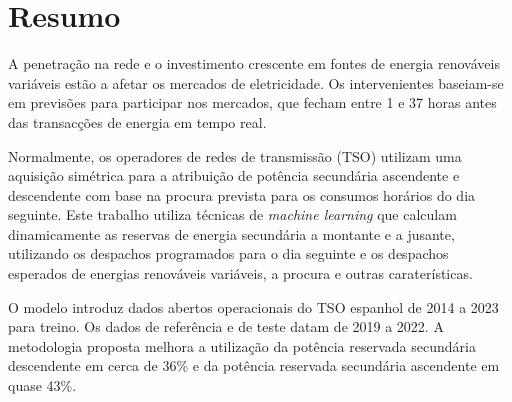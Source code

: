 \chapter{Resumo}
\justifying
A penetração na rede e o investimento crescente em fontes de energia renováveis variáveis estão a afetar os mercados de eletricidade. Os intervenientes baseiam-se em previsões para participar nos mercados, que fecham entre 1 e 37 horas antes das transacções de energia em tempo real.\par
Normalmente, os operadores de redes de transmissão (TSO) utilizam uma aquisição simétrica para a atribuição de potência secundária ascendente e descendente com base na procura prevista para os consumos horários do dia seguinte. Este trabalho utiliza técnicas de \emph{machine learning} que calculam dinamicamente as reservas de energia secundária a montante e a jusante, utilizando os despachos programados para o dia seguinte e os despachos esperados de energias renováveis variáveis, a procura e outras caraterísticas.\par
O modelo introduz dados abertos operacionais do TSO espanhol de 2014 a 2023 para treino. Os dados de referência e de teste datam de 2019 a 2022. A metodologia proposta melhora a utilização da potência reservada secundária descendente em cerca de 36\% e da potência reservada secundária ascendente em quase 43\%. \par


\vspace{0.5cm} %

